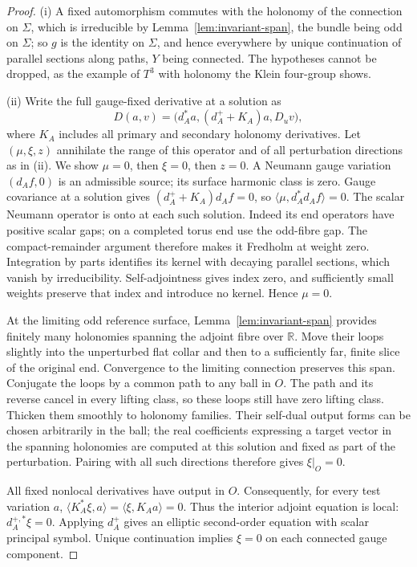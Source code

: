\documentclass[11pt]{amsart}
\theoremstyle{definition}
\theoremstyle{remark}
\theoremstyle{plain}
\numberwithin{equation}{section}
\begin{document}
\begin{proof}
(i) A fixed automorphism commutes with the holonomy of the connection
on $\Sigma$, which is irreducible by Lemma~\ref{lem:invariant-span}, the
bundle being odd on $\Sigma$; so $g$ is the identity on $\Sigma$, and hence everywhere by unique
continuation of parallel sections along paths, $Y$ being connected. The
hypotheses cannot be dropped, as the example of $T^3$ with holonomy the
Klein four-group shows.

(ii) Write the full gauge-fixed derivative at a solution as
\[
D(a,v)=\bigl(d_A^*a,(d_A^++K_A)a,D_uv\bigr),
\]
where $K_A$ includes all primary and secondary holonomy derivatives.
Let $(\mu,\xi,z)$ annihilate the range of this operator and of all
perturbation directions as in (ii). We show $\mu=0$, then $\xi=0$, then $z=0$. A Neumann gauge variation $(d_Af,0)$ is an admissible
source; its surface harmonic class is zero. Gauge covariance at a
solution gives $(d_A^++K_A)d_Af=0$, so
$\langle\mu,d_A^*d_Af\rangle=0$.
The scalar Neumann operator is onto at each such solution. Indeed
its end operators have positive scalar gaps; on a completed torus
end use the odd-fibre gap. The compact-remainder argument therefore
makes it Fredholm at weight zero. Integration by parts identifies
its kernel with decaying parallel sections, which vanish by
irreducibility. Self-adjointness gives index zero, and sufficiently
small weights preserve that index and introduce no kernel. Hence $\mu=0$.

At the limiting odd reference surface, Lemma~\ref{lem:invariant-span}
provides finitely many holonomies spanning the adjoint fibre over
$\mathbb R$. Move their loops slightly into the unperturbed flat
collar and then to a sufficiently far, finite slice of the original
end. Convergence to the limiting connection preserves this span.
Conjugate the loops by a common path to any ball in $O$. The path and
its reverse cancel in every lifting class, so these loops still have
zero lifting class. Thicken them smoothly to
holonomy families. Their self-dual output forms can be chosen
arbitrarily in the ball; the real coefficients expressing a target
vector in the spanning holonomies are computed at this solution
and fixed as part of the perturbation. Pairing with all such
directions therefore gives $\xi|_O=0$.

All fixed nonlocal derivatives have output in $O$. Consequently,
for every test variation $a$,
$\langle K_A^*\xi,a\rangle=\langle\xi,K_Aa\rangle=0$.
Thus the interior adjoint equation is local:
$d_A^{+,*}\xi=0$. Applying $d_A^+$ gives an elliptic second-order
equation with scalar principal symbol. Unique continuation
\cite{Aronszajn} implies $\xi=0$ on each connected gauge component.


\end{proof}
\end{document}
